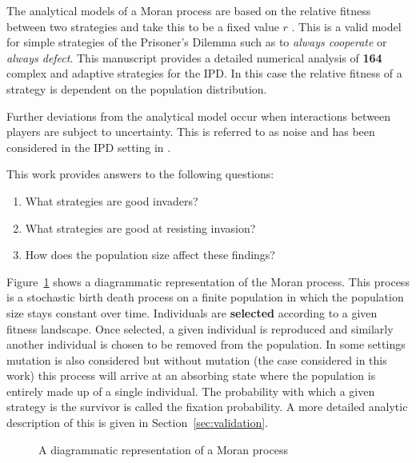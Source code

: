 \documentclass{article}
\begin{document}
The analytical models of a Moran process are based on the relative fitness
between two strategies and take this to be a fixed value \(r\) \cite{Nowak}.
This is a valid model for simple strategies of the Prisoner's Dilemma such as to
\textit{always cooperate} or \textit{always defect}. This manuscript provides a
detailed numerical analysis of \textbf{164} complex and adaptive strategies for
the IPD\@. In this case the relative fitness of a strategy is dependent on the
population distribution.

Further deviations from the analytical model occur when interactions between
players are subject to uncertainty. This is referred to as noise and has been
considered in the IPD setting in \cite{Bendor1993, Nowak1993, Wu1995}.

This work provides answers to the following questions:

\begin{enumerate}
    \item What strategies are good invaders?
    \item What strategies are good at resisting invasion?
    \item How does the population size affect these findings?
\end{enumerate}

Figure~\ref{fig:moran_process} shows a diagrammatic representation of the Moran
process. This process is a stochastic birth death process on a finite population
in which the population size stays constant over time. Individuals are
\textbf{selected} according to a given fitness landscape. Once selected, a given
individual is reproduced and similarly another individual is chosen to be
removed from the population. In some settings mutation is also considered but
without mutation (the case considered in this work) this process will arrive at
an absorbing state where the population is entirely made up of a single
individual. The probability with which a given strategy is the survivor is
called the fixation probability. A more detailed analytic description of this
is given in Section~\ref{sec:validation}.

\begin{figure}[!hbtp]
    \centering
    
    \caption{A diagrammatic representation of a Moran process}
    \label{fig:moran_process}
\end{figure}
\end{document}
